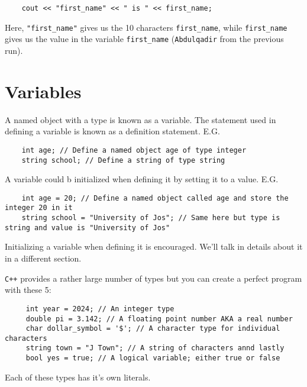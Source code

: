 \documentclass{book}
\begin{document}
\begin{verbatim}
	cout << "first_name" << " is " << first_name;
\end{verbatim}

Here, \verb|"first_name"| gives us the 10 characters \verb|first_name|, while \verb|first_name| gives us the value in the variable \verb|first_name| (\verb|Abdulqadir| from the previous run).

\section{Variables}
A named object with a type is known as a variable. The statement used in defining a variable is known as a definition statement. E.G.

\begin{verbatim}
	int age; // Define a named object age of type integer
	string school; // Define a string of type string
\end{verbatim}

A variable could b initialized when defining it by setting it to a value. E.G.

\begin{verbatim}
	int age = 20; // Define a named object called age and store the integer 20 in it
	string school = "University of Jos"; // Same here but type is string and value is "University of Jos"
\end{verbatim}

Initializing a variable when defining it is encouraged. We'll talk in details about it in a different section.


\verb|C++| provides a rather large number of types but you can create a perfect program with these 5:

\begin{verbatim}
	 int year = 2024; // An integer type
	 double pi = 3.142; // A floating point number AKA a real number
	 char dollar_symbol = '$'; // A character type for individual characters
	 string town = "J Town"; // A string of characters annd lastly
	 bool yes = true; // A logical variable; either true or false
\end{verbatim}

Each of these types has it's own literals.
\end{document}
